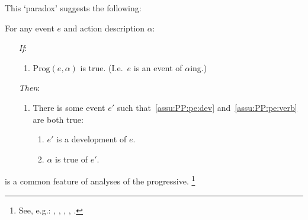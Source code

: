 \begin{note}
  This `paradox' suggests the following:

    \begin{assumption}[\assuPP{2}]
    \label{assu:PP}
    For any event \(e\) and action description \(\alpha\):
    \begin{enumerate}
    \item[\emph{If}:]
      \begin{enumerate}[label=\alph*., ref=(\alph*)]
      \item
        \(\text{Prog}(e,\alpha)\) is true.%
        \hfill(I.e.\ \(e\) is an event of \(\alpha\)ing.)
      \end{enumerate}
    \item[\emph{Then}:]
      \begin{enumerate}[label=\alph*., ref=(\alph*), resume]
      \item
        There is some  event \(e'\) such that~\ref{assu:PP:pe:dev} and~\ref{assu:PP:pe:verb} are both true:
        \begin{enumerate}[label=\roman*., ref=(\roman*)]
        \item
          \label{assu:PP:pe:dev}
          \(e'\) is a development of \(e\).
        \item
          \label{assu:PP:pe:verb}
          \(\alpha\) is true of \(e'\).
        \end{enumerate}
      \end{enumerate}
    \end{enumerate}
    \vspace{-\baselineskip}
  \end{assumption}

   is a common feature of analyses of the progressive.%
  \footnote{
    See, e.g.:
    \cite{Bennett:1972uw},
    \cite{Dowty:1979vq},
    \cite{Parsons:1990aa},
    \cite{Landman:1992wh},
    \cite{Portner:1998um}.

}
\end{note}
